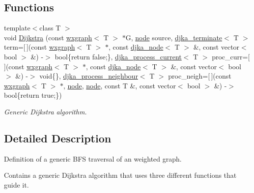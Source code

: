 \subsection*{Functions}
\begin{DoxyCompactItemize}
\item 
{\footnotesize template$<$class T $>$ }\\void \hyperlink{namespacelgraph_1_1traversal_1_1dijkstra_a841778a8e888fb90b5a39d54e5d776eb}{Dijkstra} (const \hyperlink{classlgraph_1_1utils_1_1wxgraph}{wxgraph}$<$ T $>$ $\ast$G, \hyperlink{namespacelgraph_1_1utils_a7bd66ede3805ef121bc2835bd48de0cf}{node} source, \hyperlink{namespacelgraph_1_1traversal_1_1dijkstra_a275e9ff05e4d3199245b9642cc88fc74}{djka\+\_\+terminate}$<$ T $>$ term=\mbox{[}$\,$\mbox{]}(const \hyperlink{classlgraph_1_1utils_1_1wxgraph}{wxgraph}$<$ T $>$ $\ast$, const \hyperlink{namespacelgraph_1_1traversal_1_1dijkstra_a06495bda19735564a02a6e98198a0980}{djka\+\_\+node}$<$ T $>$ \&, const vector$<$ bool $>$ \&) -\/$>$ bool\{return false;\}, \hyperlink{namespacelgraph_1_1traversal_1_1dijkstra_a1b15b8b987d2eea35dd01676ba1d3b35}{djka\+\_\+process\+\_\+current}$<$ T $>$ proc\+\_\+curr=\mbox{[}$\,$\mbox{]}(const \hyperlink{classlgraph_1_1utils_1_1wxgraph}{wxgraph}$<$ T $>$ $\ast$, const \hyperlink{namespacelgraph_1_1traversal_1_1dijkstra_a06495bda19735564a02a6e98198a0980}{djka\+\_\+node}$<$ T $>$ \&, const vector$<$ bool $>$ \&) -\/$>$ void\{\}, \hyperlink{namespacelgraph_1_1traversal_1_1dijkstra_abd266610f7bab0d52a202238ca539d38}{djka\+\_\+process\+\_\+neighbour}$<$ T $>$ proc\+\_\+neigh=\mbox{[}$\,$\mbox{]}(const \hyperlink{classlgraph_1_1utils_1_1wxgraph}{wxgraph}$<$ T $>$ $\ast$, \hyperlink{namespacelgraph_1_1utils_a7bd66ede3805ef121bc2835bd48de0cf}{node}, \hyperlink{namespacelgraph_1_1utils_a7bd66ede3805ef121bc2835bd48de0cf}{node}, const T \&, const vector$<$ bool $>$ \&) -\/$>$ bool\{return true;\})
\begin{DoxyCompactList}\small\item\em Generic Dijkstra algorithm. \end{DoxyCompactList}\end{DoxyCompactItemize}


\subsection{Detailed Description}
Definition of a generic B\+FS traversal of an weighted graph. 

Contains a generic Dijkstra algorithm that uses three different functions that guide it. 

